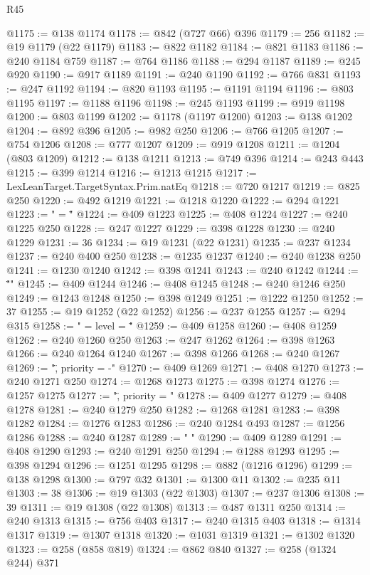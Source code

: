 \begin{lexlean}{R45}
\begin{coremodule}
@1175 := @138 @1174
@1178 := @842 (@727 @66) @396
@1179 := 256
@1182 := @19 @1179 (@22 @1179)
@1183 := @822 @1182
@1184 := @821 @1183
@1186 := @240 @1184 @759
@1187 := @764 @1186
@1188 := @294 @1187
@1189 := @245 @920
@1190 := @917 @1189
@1191 := @240 @1190
@1192 := @766 @831
@1193 := @247 @1192
@1194 := @820 @1193
@1195 := @1191 @1194
@1196 := @803 @1195
@1197 := @1188 @1196
@1198 := @245 @1193
@1199 := @919 @1198
@1200 := @803 @1199
@1202 := @1178 (@1197 @1200)
@1203 := @138 @1202
@1204 := @892 @396
@1205 := @982 @250
@1206 := @766 @1205
@1207 := @754 @1206
@1208 := @777 @1207
@1209 := @919 @1208
@1211 := @1204 (@803 @1209)
@1212 := @138 @1211
@1213 := @749 @396
@1214 := @243 @443
@1215 := @399 @1214
@1216 := @1213 @1215
@1217 := LexLeanTarget.TargetSyntax.Prim.natEq
@1218 := @720 @1217
@1219 := @825 @250
@1220 := @492 @1219
@1221 := @1218 @1220
@1222 := @294 @1221
@1223 := " = \""
@1224 := @409 @1223
@1225 := @408 @1224
@1227 := @240 @1225 @250
@1228 := @247 @1227
@1229 := @398 @1228
@1230 := @240 @1229
@1231 := 36
@1234 := @19 @1231 (@22 @1231)
@1235 := @237 @1234
@1237 := @240 @400 @250
@1238 := @1235 @1237
@1240 := @240 @1238 @250
@1241 := @1230 @1240
@1242 := @398 @1241
@1243 := @240 @1242
@1244 := "\"\n"
@1245 := @409 @1244
@1246 := @408 @1245
@1248 := @240 @1246 @250
@1249 := @1243 @1248
@1250 := @398 @1249
@1251 := @1222 @1250
@1252 := 37
@1255 := @19 @1252 (@22 @1252)
@1256 := @237 @1255
@1257 := @294 @315
@1258 := " = { level = \""
@1259 := @409 @1258
@1260 := @408 @1259
@1262 := @240 @1260 @250
@1263 := @247 @1262
@1264 := @398 @1263
@1266 := @240 @1264 @1240
@1267 := @398 @1266
@1268 := @240 @1267
@1269 := "\", priority = -"
@1270 := @409 @1269
@1271 := @408 @1270
@1273 := @240 @1271 @250
@1274 := @1268 @1273
@1275 := @398 @1274
@1276 := @1257 @1275
@1277 := "\", priority = "
@1278 := @409 @1277
@1279 := @408 @1278
@1281 := @240 @1279 @250
@1282 := @1268 @1281
@1283 := @398 @1282
@1284 := @1276 @1283
@1286 := @240 @1284 @493
@1287 := @1256 @1286
@1288 := @240 @1287
@1289 := " }\n"
@1290 := @409 @1289
@1291 := @408 @1290
@1293 := @240 @1291 @250
@1294 := @1288 @1293
@1295 := @398 @1294
@1296 := @1251 @1295
@1298 := @882 (@1216 @1296)
@1299 := @138 @1298
@1300 := @797 @32
@1301 := @1300 @11
@1302 := @235 @11
@1303 := 38
@1306 := @19 @1303 (@22 @1303)
@1307 := @237 @1306
@1308 := 39
@1311 := @19 @1308 (@22 @1308)
@1313 := @487 @1311 @250
@1314 := @240 @1313
@1315 := @756 @403
@1317 := @240 @1315 @403
@1318 := @1314 @1317
@1319 := @1307 @1318
@1320 := @1031 @1319
@1321 := @1302 @1320
@1323 := @258 (@858 @819)
@1324 := @862 @840
@1327 := @258 (@1324 @244) @371

\end{coremodule}
\end{lexlean}
